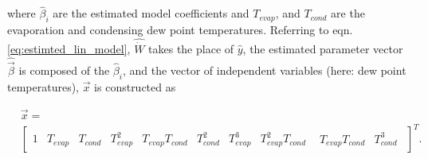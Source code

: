 where $\hat{\beta}_i$ are the estimated model coefficients and $T_{evap}$, and $T_{cond}$ are the evaporation and condensing dew point temperatures. Referring to eqn. \ref{eq:estimted_lin_model}, $\hat {\dot W}$ takes the place of $\hat y$, the estimated parameter vector  $\hat {\vec \beta}$ is composed of the $\hat{\beta}_i$, and the vector of independent variables (here: dew point temperatures), $\vec x$ is constructed as

\begin{equation}
\begin{split}
&\vec x = \\
&{\left[ {\begin{array}{*{20}{c}}
  1&{{T_{evap}}}&{{T_{cond}}}&{T_{evap}^2}&{{T_{evap}}{T_{cond}}}&{T_{cond}^2}&{T_{evap}^3}&{T_{evap}^2{T_{cond}}}&{\begin{array}{*{20}{c}}
  {{T_{evap}}{T_{cond}}}&{T_{cond}^3}
\end{array}} 
\end{array}} \right]^T}.
\end{split}
\label{eq:lin_reg_temp_vec}
\end{equation}
